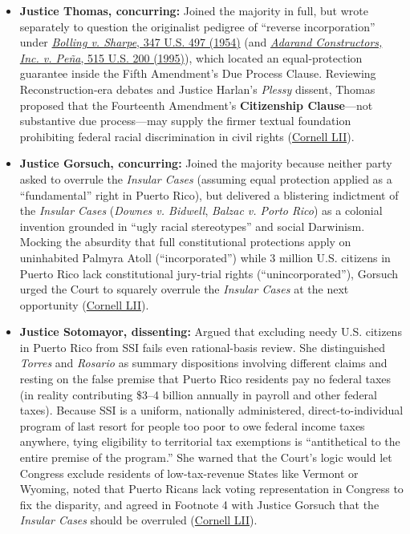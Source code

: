 \documentclass[12pt]{article}
\begin{document}
\begin{itemize}
  \item \textbf{Justice Thomas, concurring:} Joined the majority in full, but wrote separately to question the originalist pedigree of ``reverse incorporation'' under \href{https://supreme.justia.com/cases/federal/us/347/497/}{\emph{Bolling v. Sharpe}, 347 U.S. 497 (1954)} (and \href{https://supreme.justia.com/cases/federal/us/515/200/}{\emph{Adarand Constructors, Inc. v. Pe\~na}, 515 U.S. 200 (1995)}), which located an equal-protection guarantee inside the Fifth Amendment's Due Process Clause. Reviewing Reconstruction-era debates and Justice Harlan's \emph{Plessy} dissent, Thomas proposed that the Fourteenth Amendment's \textbf{Citizenship Clause}---not substantive due process---may supply the firmer textual foundation prohibiting federal racial discrimination in civil rights (\href{https://www.law.cornell.edu/supremecourt/text/20-303}{Cornell LII}).
  \item \textbf{Justice Gorsuch, concurring:} Joined the majority because neither party asked to overrule the \emph{Insular Cases} (assuming equal protection applied as a ``fundamental'' right in Puerto Rico), but delivered a blistering indictment of the \emph{Insular Cases} (\emph{Downes v. Bidwell}, \emph{Balzac v. Porto Rico}) as a colonial invention grounded in ``ugly racial stereotypes'' and social Darwinism. Mocking the absurdity that full constitutional protections apply on uninhabited Palmyra Atoll (``incorporated'') while 3 million U.S. citizens in Puerto Rico lack constitutional jury-trial rights (``unincorporated''), Gorsuch urged the Court to squarely overrule the \emph{Insular Cases} at the next opportunity (\href{https://www.law.cornell.edu/supremecourt/text/20-303}{Cornell LII}).
  \item \textbf{Justice Sotomayor, dissenting:} Argued that excluding needy U.S. citizens in Puerto Rico from SSI fails even rational-basis review. She distinguished \emph{Torres} and \emph{Rosario} as summary dispositions involving different claims and resting on the false premise that Puerto Rico residents pay no federal taxes (in reality contributing \$3--4 billion annually in payroll and other federal taxes). Because SSI is a uniform, nationally administered, direct-to-individual program of last resort for people too poor to owe federal income taxes anywhere, tying eligibility to territorial tax exemptions is ``antithetical to the entire premise of the program.'' She warned that the Court's logic would let Congress exclude residents of low-tax-revenue States like Vermont or Wyoming, noted that Puerto Ricans lack voting representation in Congress to fix the disparity, and agreed in Footnote 4 with Justice Gorsuch that the \emph{Insular Cases} should be overruled (\href{https://www.law.cornell.edu/supremecourt/text/20-303}{Cornell LII}).
\end{itemize}
\end{document}

